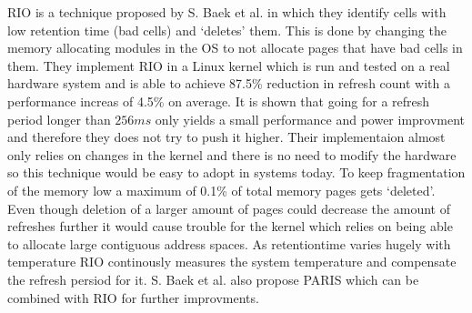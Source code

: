 RIO is a technique proposed by S. Baek et al. \cite{rioparis} in which they identify cells with low retention time (bad cells) and `deletes' them. This is done by changing the memory allocating modules in the OS to not allocate pages that have bad cells in them. They implement RIO in a Linux kernel which is run and tested on a real hardware system and is able to achieve 87.5\% reduction in refresh count with a performance increas of 4.5\% on average. It is shown that going for a refresh period longer than \(256ms\) only yields a small performance and power improvment and therefore they does not try to push it higher. Their implementaion almost only relies on changes in the kernel and there is no need to modify the hardware so this technique would be easy to adopt in systems today. To keep fragmentation of the memory low a maximum of 0.1\% of total memory pages gets `deleted'. Even though deletion of a larger amount of pages could decrease the amount of refreshes further it would cause trouble for the kernel which relies on being able to allocate large contiguous address spaces. As retentiontime varies hugely with temperature RIO continously measures the system temperature and compensate the refresh persiod for it. S. Baek et al. also propose PARIS which can be combined with RIO for further improvments. 